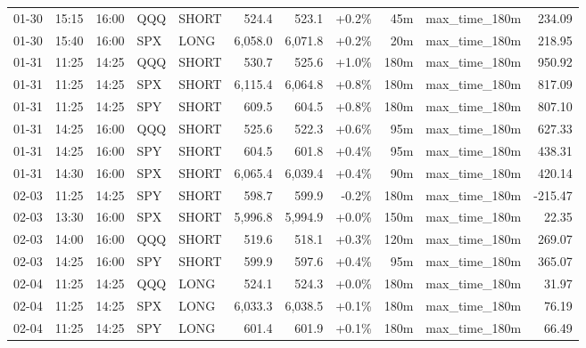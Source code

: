 \documentclass[11pt,a4paper,twoside]{article}
\begin{document}
\begin{center}
\begin{longtable}{>{\color{txtmain}}l l l l l r r r r >{\color{txtmain}}l r}
01-30 & 15:15 & 16:00 & QQQ & SHORT & 524.4 & 523.1 & \textcolor{wingreen}{+0.2\%} & 45m & max\_time\_180m & \textcolor{wingreen}{234.09} \\
01-30 & 15:40 & 16:00 & SPX & LONG & 6,058.0 & 6,071.8 & \textcolor{wingreen}{+0.2\%} & 20m & max\_time\_180m & \textcolor{wingreen}{218.95} \\
01-31 & 11:25 & 14:25 & QQQ & SHORT & 530.7 & 525.6 & \textcolor{wingreen}{+1.0\%} & 180m & max\_time\_180m & \textcolor{wingreen}{950.92} \\
01-31 & 11:25 & 14:25 & SPX & SHORT & 6,115.4 & 6,064.8 & \textcolor{wingreen}{+0.8\%} & 180m & max\_time\_180m & \textcolor{wingreen}{817.09} \\
01-31 & 11:25 & 14:25 & SPY & SHORT & 609.5 & 604.5 & \textcolor{wingreen}{+0.8\%} & 180m & max\_time\_180m & \textcolor{wingreen}{807.10} \\
01-31 & 14:25 & 16:00 & QQQ & SHORT & 525.6 & 522.3 & \textcolor{wingreen}{+0.6\%} & 95m & max\_time\_180m & \textcolor{wingreen}{627.33} \\
01-31 & 14:25 & 16:00 & SPY & SHORT & 604.5 & 601.8 & \textcolor{wingreen}{+0.4\%} & 95m & max\_time\_180m & \textcolor{wingreen}{438.31} \\
01-31 & 14:30 & 16:00 & SPX & SHORT & 6,065.4 & 6,039.4 & \textcolor{wingreen}{+0.4\%} & 90m & max\_time\_180m & \textcolor{wingreen}{420.14} \\
02-03 & 11:25 & 14:25 & SPY & SHORT & 598.7 & 599.9 & \textcolor{lossred}{-0.2\%} & 180m & max\_time\_180m & \textcolor{lossred}{-215.47} \\
02-03 & 13:30 & 16:00 & SPX & SHORT & 5,996.8 & 5,994.9 & \textcolor{wingreen}{+0.0\%} & 150m & max\_time\_180m & \textcolor{wingreen}{22.35} \\
02-03 & 14:00 & 16:00 & QQQ & SHORT & 519.6 & 518.1 & \textcolor{wingreen}{+0.3\%} & 120m & max\_time\_180m & \textcolor{wingreen}{269.07} \\
02-03 & 14:25 & 16:00 & SPY & SHORT & 599.9 & 597.6 & \textcolor{wingreen}{+0.4\%} & 95m & max\_time\_180m & \textcolor{wingreen}{365.07} \\
02-04 & 11:25 & 14:25 & QQQ & LONG & 524.1 & 524.3 & \textcolor{wingreen}{+0.0\%} & 180m & max\_time\_180m & \textcolor{wingreen}{31.97} \\
02-04 & 11:25 & 14:25 & SPX & LONG & 6,033.3 & 6,038.5 & \textcolor{wingreen}{+0.1\%} & 180m & max\_time\_180m & \textcolor{wingreen}{76.19} \\
02-04 & 11:25 & 14:25 & SPY & LONG & 601.4 & 601.9 & \textcolor{wingreen}{+0.1\%} & 180m & max\_time\_180m & \textcolor{wingreen}{66.49} \\

\end{longtable}
\end{center}
\end{document}
